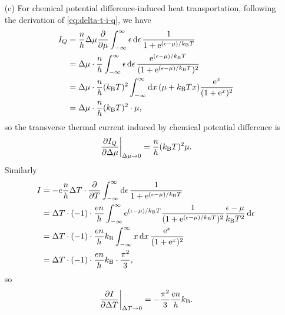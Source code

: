 \documentclass[hyperref, a4paper]{article}
\newcommand*{\ee}{\mathrm{e}}
\begin{document}
\begin{itemize}
\item[(c)] For chemical potential difference-induced heat transportation,
following the derivation of \eqref{eq:delta-t-i-q}, we have 
\begin{equation}
    \begin{aligned}
        I_Q &= \frac{n}{h} \Delta \mu \pdv{\mu} \int^\infty_{-\infty} \epsilon \dd{\epsilon} \frac{1}{1 + \ee^{(\epsilon - \mu) / k_{\text{B}} T}} \\
        &= \Delta \mu \cdot \frac{n}{h} \int^\infty_{-\infty} \epsilon \dd{\epsilon}
        \frac{\ee^{(\epsilon - \mu) / k_{\text{B}} T}}{(1 + \ee^{(\epsilon - \mu) / k_{\text{B}} T})^2} \\
        &= \Delta \mu \cdot \frac{n}{h} (k_{\text{B}} T)^2 \int^\infty_{-\infty} \dd{x}
        (\mu + k_{\text{B}} T x) \frac{\ee^x}{(1 + \ee^x)^2} \\
        &= \Delta \mu \cdot \frac{n}{h} (k_{\text{B}} T)^2 \cdot \mu,
    \end{aligned}
\end{equation}
so the transverse thermal current induced by chemical potential difference is 
\begin{equation}
    \eval{\pdv{I_Q}{\Delta \mu}}_{\Delta \mu \to 0} = \frac{n}{h} (k_{\text{B}} T)^2 \mu.
\end{equation}
Similarly 
\begin{equation}
    \begin{aligned}
        I &= - e \frac{n}{h} \Delta T \cdot \pdv{T} \int^\infty_{-\infty} \dd{\epsilon} \frac{1}{1 + \ee^{(\epsilon - \mu) / k_{\text{B}} T}} \\
        &= \Delta T \cdot (-1) \cdot \frac{en}{h} \int^\infty_{-\infty} 
        \ee^{(\epsilon - \mu) / k_{\text{B}} T} 
        \frac{1}{(1 + \ee^{(\epsilon - \mu) / k_{\text{B}} T})^2}
        \frac{\epsilon - \mu}{k_{\text{B}} T^2} \dd{\epsilon} \\
        &= \Delta T \cdot (-1) \cdot \frac{en}{h} k_{\text{B}} \int^\infty_{-\infty} x \dd{x} 
        \frac{\ee^x}{(1 + \ee^x)^2} \\
        &= \Delta T \cdot (-1) \cdot \frac{en}{h} k_{\text{B}} \cdot \frac{\pi^2}{3},
    \end{aligned}
\end{equation}
so 
\begin{equation}
    \eval{\pdv{I}{\Delta T}}_{\Delta T \to 0} = - \frac{\pi^2}{3} \frac{en}{h} k_{\text{B}}.
\end{equation}

\end{itemize}
\end{document}
